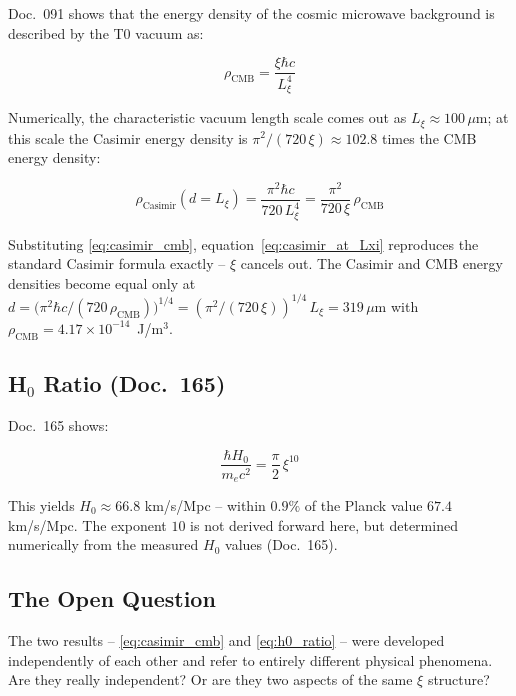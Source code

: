 Doc.~091 shows that the energy density of the cosmic microwave background
is described by the T0 vacuum as:

\begin{equation}
    \rho_\text{CMB} = \frac{\xi \hbar c}{L_\xi^4}
    \label{eq:casimir_cmb}
\end{equation}

Numerically, the characteristic vacuum length scale comes out as
$L_\xi \approx 100\,\mu\text{m}$; at this scale the Casimir energy density is
$\pi^2/(720\,\xi) \approx 102.8$ times the CMB energy density:

\begin{equation}
    \rho_\text{Casimir}(d = L_\xi)
    = \frac{\pi^2 \hbar c}{720\,L_\xi^4}
    = \frac{\pi^2}{720\,\xi}\,\rho_\text{CMB}
    \label{eq:casimir_at_Lxi}
\end{equation}

Substituting \eqref{eq:casimir_cmb}, equation~\eqref{eq:casimir_at_Lxi} reproduces
the standard Casimir formula exactly -- $\xi$ cancels out. The Casimir and CMB
energy densities become equal only at
$d = \bigl(\pi^2\hbar c/(720\,\rho_\text{CMB})\bigr)^{1/4} = (\pi^2/(720\,\xi))^{1/4}\,L_\xi = 319\,\mu\text{m}$
with $\rho_\text{CMB} = 4.17\times10^{-14}$~J/m$^3$.

\subsection{H\texorpdfstring{$_0$}{0} Ratio (Doc.~165)}

Doc.~165 shows:

\begin{equation}
    \frac{\hbar H_0}{m_e c^2} = \frac{\pi}{2}\,\xi^{10}
    \label{eq:h0_ratio}
\end{equation}

This yields $H_0 \approx 66.8$ km/s/Mpc -- within $0.9\%$ of the
Planck value $67.4$ km/s/Mpc. The exponent $10$ is not derived forward here,
but determined numerically from the measured $H_0$ values (Doc.~165).

\subsection{The Open Question}

The two results -- \eqref{eq:casimir_cmb} and \eqref{eq:h0_ratio} -- were
developed independently of each other and refer to entirely different
physical phenomena. Are they really independent? Or are they two
aspects of the same $\xi$ structure?


